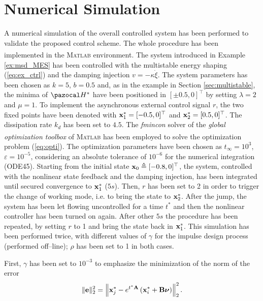 \section{Numerical Simulation}
%
A numerical simulation of the overall controlled system has been performed to validate the proposed control scheme. The whole procedure has been implemented in the \textsc{Matlab}\textsuperscript{\textregistered}%
environment. The system introduced in Example \ref{ex:msd_MES} has been controlled with the multistable energy shaping (\ref{eq:ex_ctrl}) and the damping injection $v = -\kappa\dot{\xi}$. The system parameters has been chosen as $k = 5$, $b = 0.5$ and, as in the example in Section \ref{sec:multistable}, the minima of $\Ha^*$ have been positioned in $[\pm 0.5,0]^\top$ by setting $\lambda = 2$ and $\mu = 1$.
{%
To implement the asynchronous external control signal $r$, the two fixed points have been denoted with $\mathbf{x}_1^* = [-0.5,0]^\top$ and $\mathbf{x}_2^* = [0.5,0]^\top$.}
The dissipation rate $k_d$ has been set to $4.5$. 
The \textit{fmincon} solver of the \textit{global optimization toolbox} of \textsc{Matlab}\textsuperscript{\textregistered} has been employed to solve the optimization problem (\ref{eq:opti}). The optimization parameters have been chosen as $t_\infty=10^3$, $\varepsilon=10^{-5}$, considering an absolute tolerance of $10^{-6}$ for the numerical integration (ODE45).
Starting from the initial state $\mathbf{x}_0 \triangleq [-0.8,0]^\top$, the system, controlled with the nonlinear state feedback and the damping injection, has been integrated until secured convergence to $\mathbf{x}_1^*$ ($5s$). Then, $r$ has been set to 2 in order to trigger the change of working mode, i.e. to bring the state to $\mathbf{x}_2^*$. After the jump, the system has been let flowing uncontrolled for a time $t^*$ and then the nonlinear controller has been turned on again. After other $5s$ the procedure has been repeated, by setting $r$ to 1 and bring the state back in $\mathbf{x}_1^*$.
This simulation has been performed twice, with different values of $\gamma$ for the impulse design process (performed off--line); $\rho$ has been set to 1 in both cases. 

First, $\gamma$ has been set to $10^{-3}$ to emphasize the minimization of the norm of the error 
%
\begin{equation}
    \|\mathbf{e}\|_2^2=\left\|\mathbf{x}_j^* - e^{t^*\mathbf{A}}\left(\mathbf{x}_i^*+\mathbf{B}\bm\nu\right)\right\|^2_2.
\end{equation}
%

